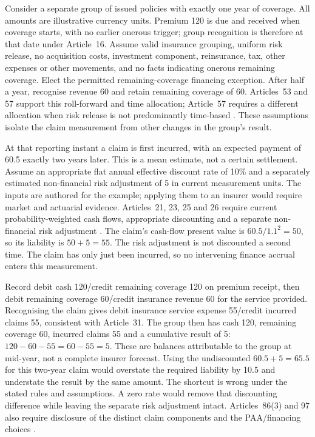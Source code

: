 Consider a separate group of issued policies with exactly one year of coverage.
All amounts are illustrative currency units. Premium 120 is due and received
when coverage starts, with no earlier onerous trigger; group recognition is
therefore at that date under Article~16. Assume valid insurance grouping,
uniform risk release, no acquisition costs, investment component, reinsurance,
tax, other expenses or other movements, and no facts indicating onerous
remaining coverage. Elect the permitted remaining-coverage financing exception.
After half a year, recognise revenue 60 and retain remaining coverage of 60.
Articles~53 and 57 support this roll-forward and time allocation; Article~57
requires a different allocation when risk release is not predominantly
time-based \citep{mofasbe25}. These assumptions isolate the claim measurement
from other changes in the group's result.

At that reporting instant a claim is first incurred, with an expected payment
of 60.5 exactly two years later. This is a mean estimate, not a certain
settlement. Assume an appropriate flat annual effective discount rate of
10\% and a separately estimated non-financial risk adjustment of 5 in current
measurement units. The inputs are authored for the example; applying them to
an insurer would require market and actuarial evidence. Articles~21, 23, 25
and 26 require current probability-weighted cash flows, appropriate discounting
and a separate non-financial risk adjustment \citep{mofasbe25}. The claim's
cash-flow present value is $60.5/1.1^2=50$, so its liability is $50+5=55$.
The risk adjustment is not discounted a second time. The claim has only just
been incurred, so no intervening finance accrual enters this measurement.

Record debit cash 120/credit remaining coverage 120 on premium receipt, then
debit remaining coverage 60/credit insurance revenue 60 for the service
provided. Recognising the claim gives debit insurance service expense 55/credit
incurred claims 55, consistent with Article~31. The group then has cash 120,
remaining coverage 60, incurred claims 55 and a cumulative result of 5:
$120-60-55=60-55=5$. These are balances attributable to the group at mid-year,
not a complete insurer forecast. Using the undiscounted $60.5+5=65.5$ for this
two-year claim would overstate the required liability by 10.5 and understate
the result by the same amount. The shortcut is wrong under the stated rules
and assumptions. A zero rate would remove that discounting difference while
leaving the separate risk adjustment intact. Articles~86(3) and 97 also require
disclosure of the distinct claim components and the PAA/financing choices
\citep{mofasbe25}.

